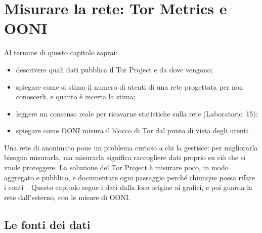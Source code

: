 \chapter{Misurare la rete: Tor Metrics e OONI}\label{cap:24-metrics}

\begin{obiettivi}
Al termine di questo capitolo saprai:
\begin{itemize}[nosep]
  \item descrivere quali dati pubblica il Tor Project e da dove vengono;
  \item spiegare come si stima il numero di utenti di una rete progettata per non conoscerli, e quanto è incerta la stima;
  \item leggere un consenso reale per ricavarne statistiche sulla rete (Laboratorio~15);
  \item spiegare come OONI misura il blocco di Tor dal punto di vista degli utenti.
\end{itemize}
\end{obiettivi}

Una rete di anonimato pone un problema curioso a chi la gestisce: per migliorarla bisogna misurarla, ma misurarla significa raccogliere dati proprio su ciò che si vuole proteggere. La soluzione del Tor Project è misurare poco, in modo aggregato e pubblico, e documentare ogni passaggio perché chiunque possa rifare i conti~\cite{metricsreproducible}. Questo capitolo segue i dati dalla loro origine ai grafici, e poi guarda la rete dall'esterno, con le misure di OONI.

\section{Le fonti dei dati}\label{sec:metrics-fonti}

